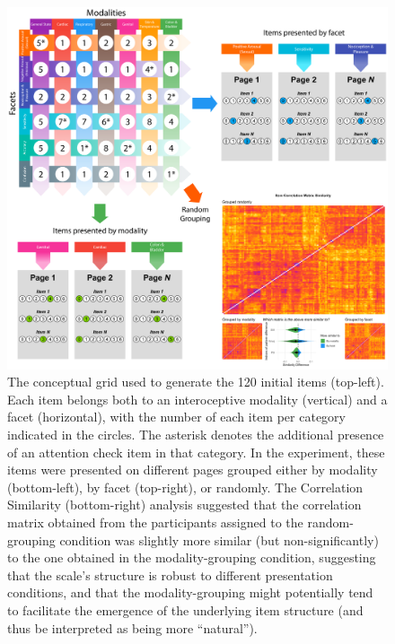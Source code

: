 \documentclass[
  jou,
  floatsintext,
  longtable,
  nolmodern,
  notxfonts,
  notimes,
  colorlinks=true,linkcolor=blue,citecolor=blue,urlcolor=blue]{apa7}
\begin{document}
\begin{figure}[!htbp]

{\caption{{The conceptual grid used to generate the 120 initial items
(top-left). Each item belongs both to an interoceptive modality
(vertical) and a facet (horizontal), with the number of each item per
category indicated in the circles. The asterisk denotes the additional
presence of an attention check item in that category. In the experiment,
these items were presented on different pages grouped either by modality
(bottom-left), by facet (top-right), or randomly. The Correlation
Similarity (bottom-right) analysis suggested that the correlation matrix
obtained from the participants assigned to the random-grouping condition
was slightly more similar (but non-significantly) to the one obtained in
the modality-grouping condition, suggesting that the scale's structure
is robust to different presentation conditions, and that the
modality-grouping might potentially tend to facilitate the emergence of
the underlying item structure (and thus be interpreted as being more
``natural'').}{\label{fig-one}}}}

\begin{center}
\includegraphics[width=1\linewidth,height=\textheight,keepaspectratio]{../study1/analysis/figures/figure1.png}
\end{center}

\end{figure}
\end{document}
